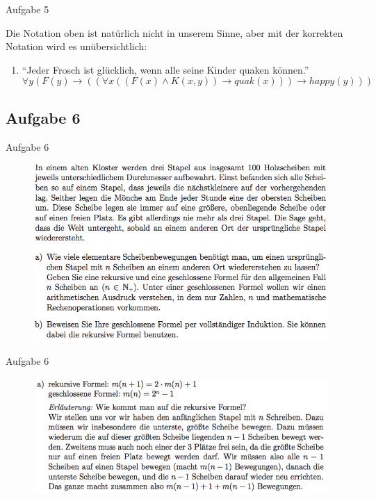 \begin{frame}{Aufgabe 5}
	
		Die Notation oben ist natürlich nicht in unserem Sinne, aber mit der korrekten Notation wird es unübersichtlich: \\[1em]

		\begin{enumerate}
			\item \enquote{Jeder Frosch ist glücklich, wenn alle seine Kinder quaken können.} \\[.3em]
				\[ \forall y (F(y) \rightarrow ((\forall x ((F(x) \wedge K(x,y)) \rightarrow quak(x) )) \rightarrow happy(y))) \]
		\end{enumerate}

\end{frame}

\subsection{Aufgabe 6}
\begin{frame}{Aufgabe 6}
\begin{figure}[h!]
		\centering
		\includegraphics[width=\textwidth]{../topics/weihnachtstut-aufgaben/13.png} 
	\end{figure}     
\end{frame}

\begin{frame}{Aufgabe 6}
\begin{figure}[h!]
		\centering
		\includegraphics[width=\textwidth]{../topics/weihnachtstut-aufgaben/14.png} 
	\end{figure}     
\end{frame}

